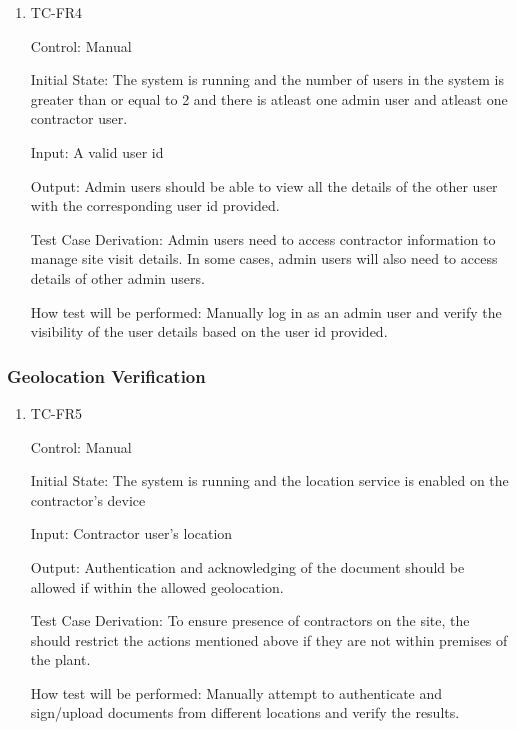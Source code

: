 \documentclass[12pt, titlepage]{article}
\begin{document}
\begin{enumerate}
  \item {TC-FR4\\}

    Control: Manual

    Initial State: The system is running and the number of users in the system
    is greater than or equal to 2 and there is atleast one admin user and
    atleast one contractor user.

    Input: A valid user id

    Output: Admin users should be able to view all the details of the other user
    with the corresponding user id provided.

    Test Case Derivation: Admin users need to access contractor information to
    manage site visit details. In some cases, admin users will also
    need to access details of other admin users.

    How test will be performed: Manually log in as an admin user and verify the
    visibility of the user details based on the user id provided.

\end{enumerate}

\subsubsection{Geolocation Verification}

\begin{enumerate}
  \item {TC-FR5\\}

    Control: Manual

    Initial State: The system is running and the location service is enabled
    on the contractor's device

    Input: Contractor user's location

    Output: Authentication and acknowledging of the document should be
    allowed if within the allowed geolocation.

    Test Case Derivation: To ensure presence of contractors on the site, the
    should restrict the actions mentioned above if they are not within premises
    of the plant.

    How test will be performed: Manually attempt to authenticate and sign/upload
    documents from different locations and verify the results.

\end{enumerate}
\end{document}
